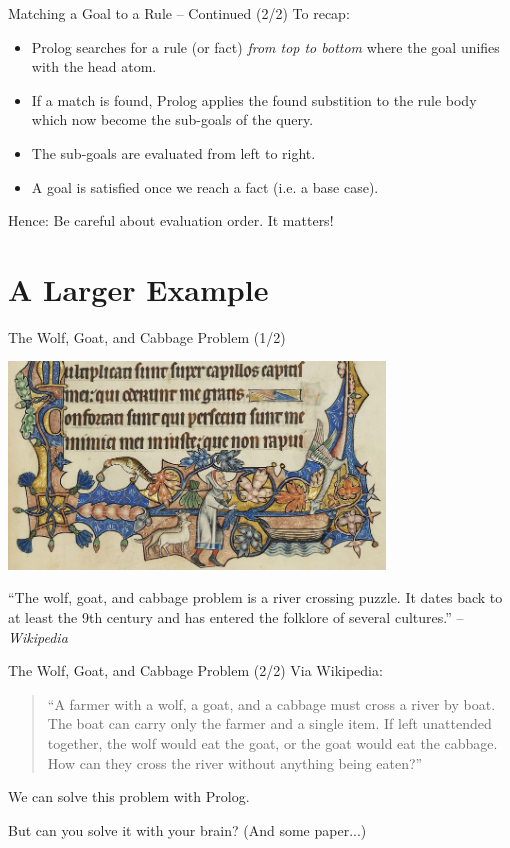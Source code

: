 \begin{frame}[fragile]{Matching a Goal to a Rule -- Continued (2/2)}
To recap:

\begin{itemize}
    \item Prolog searches for a rule (or fact) \emph{from top to bottom} where the
    goal unifies with the head atom.
    \item If a match is found, Prolog applies the found substition to the rule
    body which now become the sub-goals of the query. 
    \item The sub-goals are evaluated from left to right.
    \item A goal is satisfied once we reach a fact (i.e. a base case). 
\end{itemize}

Hence: Be careful about evaluation order. It matters!
\end{frame}

\section{A Larger Example}

\begin{frame}{The Wolf, Goat, and Cabbage Problem (1/2)}
\begin{center}
\includegraphics[width=0.75\textwidth]{img/river-problem.jpg}
\end{center}
\begin{small}
``The wolf, goat, and cabbage problem is a river crossing puzzle. It dates back
to at least the 9th century and has entered the folklore of several cultures.'' -- \textsl{Wikipedia}
\end{small}
\end{frame}

\begin{frame}{The Wolf, Goat, and Cabbage Problem (2/2)}
Via Wikipedia:

\bigskip

\begin{quote}
``A farmer with a wolf, a goat, and a cabbage must cross a river by boat. The
boat can carry only the farmer and a single item. If left unattended together,
the wolf would eat the goat, or the goat would eat the cabbage. How can they
cross the river without anything being eaten?''
\end{quote}

\bigskip

We can solve this problem with Prolog. 

\pause

But can you solve it with your brain? (And some paper...)
\end{frame}

